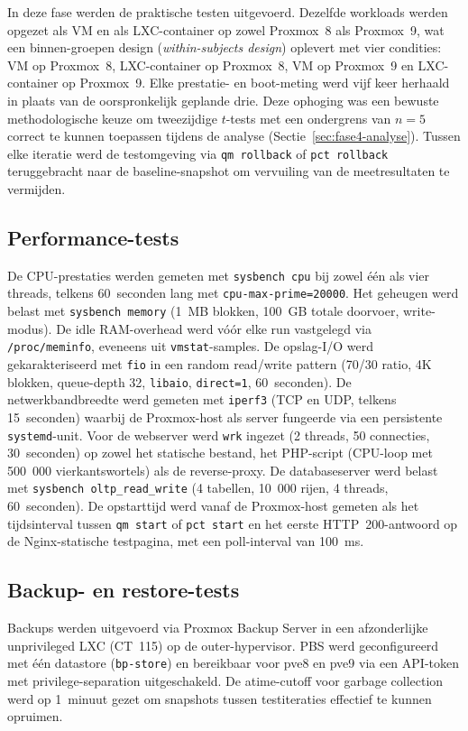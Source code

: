 In deze fase werden de praktische testen uitgevoerd. Dezelfde workloads werden opgezet als VM en als LXC-container op zowel Proxmox~8 als Proxmox~9, wat een binnen-groepen design (\textit{within-subjects design}) oplevert met vier condities: VM op Proxmox~8, LXC-container op Proxmox~8, VM op Proxmox~9 en LXC-container op Proxmox~9. Elke prestatie- en boot-meting werd vijf keer herhaald in plaats van de oorspronkelijk geplande drie. Deze ophoging was een bewuste methodologische keuze om tweezijdige $t$-tests met een ondergrens van $n=5$ correct te kunnen toepassen tijdens de analyse (Sectie~\ref{sec:fase4-analyse}). Tussen elke iteratie werd de testomgeving via \texttt{qm rollback} of \texttt{pct rollback} teruggebracht naar de baseline-snapshot om vervuiling van de meetresultaten te vermijden.

\subsection{Performance-tests}
De CPU-prestaties werden gemeten met \texttt{sysbench cpu} bij zowel één als vier threads, telkens 60~seconden lang met \texttt{cpu-max-prime=20000}. Het geheugen werd belast met \texttt{sysbench memory} (1~MB blokken, 100~GB totale doorvoer, write-modus). De idle RAM-overhead werd vóór elke run vastgelegd via \texttt{/proc/meminfo}, eveneens uit \texttt{vmstat}-samples. De opslag-I/O werd gekarakteriseerd met \texttt{fio} in een random read/write pattern (70/30 ratio, 4K blokken, queue-depth 32, \texttt{libaio}, \texttt{direct=1}, 60~seconden). De netwerkbandbreedte werd gemeten met \texttt{iperf3} (TCP en UDP, telkens 15~seconden) waarbij de Proxmox-host als server fungeerde via een persistente \texttt{systemd}-unit. Voor de webserver werd \texttt{wrk} ingezet (2 threads, 50 connecties, 30~seconden) op zowel het statische bestand, het PHP-script (CPU-loop met 500~000 vierkantswortels) als de reverse-proxy. De databaseserver werd belast met \texttt{sysbench oltp\_read\_write} (4 tabellen, 10~000 rijen, 4 threads, 60~seconden). De opstarttijd werd vanaf de Proxmox-host gemeten als het tijdsinterval tussen \texttt{qm start} of \texttt{pct start} en het eerste HTTP~200-antwoord op de Nginx-statische testpagina, met een poll-interval van 100~ms.

\subsection{Backup- en restore-tests}
Backups werden uitgevoerd via Proxmox Backup Server in een afzonderlijke unprivileged LXC (CT~115) op de outer-hypervisor. PBS werd geconfigureerd met één datastore (\texttt{bp-store}) en bereikbaar voor pve8 en pve9 via een API-token met privilege-separation uitgeschakeld. De atime-cutoff voor garbage collection werd op 1~minuut gezet om snapshots tussen testiteraties effectief te kunnen opruimen.

